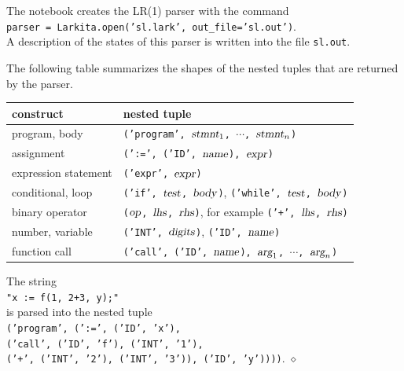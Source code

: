The notebook creates the LR(1) parser with the command
\\[0.2cm]
\hspace*{1.3cm}
\texttt{parser = Larkita.open('sl.lark', out\_file='sl.out')}.
\\[0.2cm]
A description of the states of this parser is written into the file \texttt{sl.out}.
\FloatBarrier

\noindent
The following table summarizes the shapes of the nested tuples that are returned by the parser.
\begin{center}
\begin{tabular}{|l|l|}
\hline
\textbf{construct}     & \textbf{nested tuple} \\
\hline
program, body          & \texttt{('program', $\textsl{stmnt}_1$, $\cdots$, $\textsl{stmnt}_n$)} \\
assignment             & \texttt{(':=', ('ID', $\textsl{name}$), $\textsl{expr}$)} \\
expression statement   & \texttt{('expr', $\textsl{expr}$)} \\
conditional, loop      & \texttt{('if', $\textsl{test}$, $\textsl{body}$)}, \texttt{('while', $\textsl{test}$, $\textsl{body}$)} \\
binary operator        & \texttt{($\textsl{op}$, $\textsl{lhs}$, $\textsl{rhs}$)}, for example \texttt{('+', $\textsl{lhs}$, $\textsl{rhs}$)} \\
number, variable       & \texttt{('INT', $\textsl{digits}$)}, \texttt{('ID', $\textsl{name}$)} \\
function call          & \texttt{('call', ('ID', $\textsl{name}$), $\textsl{arg}_1$, $\cdots$, $\textsl{arg}_n$)} \\
\hline
\end{tabular}
\end{center}

\exampleEng
The string
\\[0.2cm]
\hspace*{1.3cm}
\texttt{"x := f(1, 2+3, y);"}
\\[0.2cm]
is parsed into the nested tuple
\\[0.2cm]
\hspace*{0.3cm}
\texttt{('program', (':=', ('ID', 'x'),}
\\
\hspace*{0.8cm}
\texttt{('call', ('ID', 'f'), ('INT', '1'),}
\\
\hspace*{1.3cm}
\texttt{('+', ('INT', '2'), ('INT', '3')), ('ID', 'y'))))}.
\hspace*{\fill} $\diamond$

